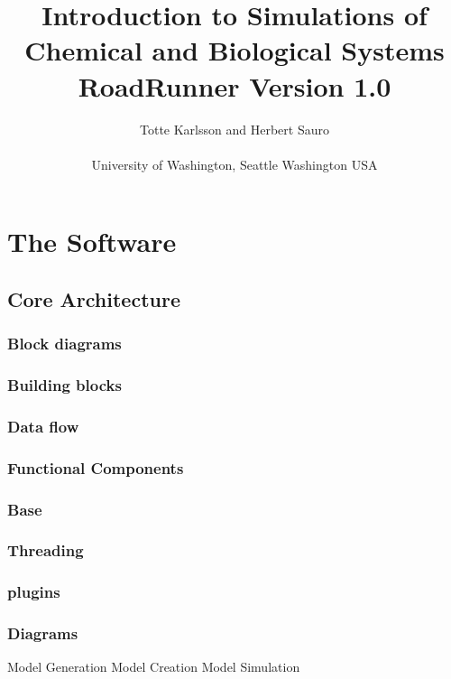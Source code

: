 \documentclass[12pt, letter, oneside]{book}
\begin{document}
\author{Totte Karlsson and Herbert Sauro
\\\\University of Washington, Seattle Washington USA}
\title{Introduction to Simulations of Chemical and Biological Systems 
\\ RoadRunner Version 1.0
}
\maketitle


\setcounter{page}{1}
\tableofcontents
{}


\section{The Software}
\subsection{Core Architecture}
\subsubsection{Block diagrams}
\subsubsection{Building blocks}
\subsubsection{Data flow}
\subsubsection{Functional Components}
\subsubsection{Base}
\subsubsection{Threading}
\subsubsection{plugins}
\subsubsection{Diagrams}
Model Generation
Model Creation
Model Simulation
\end{document}
